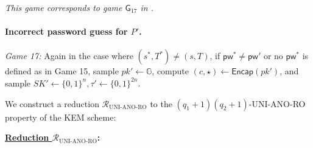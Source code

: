 \documentclass{article}
\theoremstyle{plain}
\theoremstyle{definition}
\theoremstyle{remark}
\newcommand{\group}{\mathbb{G}}
\newcommand{\red}{\mathcal{R}}
\newcommand{\Encap}{\mathsf{Encap}}
\newcommand{\pw}{\mathsf{pw}}
\begin{document}
\emph{{\color{red}This game corresponds to game $\mathsf{G}_{17}$ in \cite{EPRINT:ArrBarJar25}.}}

\paragraph{Incorrect password guess for $P'$.}
\mbox{}

\medskip\noindent\emph{Game 17:} Again in the case where $(s^*,T^*) \neq (s,T)$, if $\pw^* \neq \pw'$ or no $\pw^*$ is defined as in Game 15, sample $pk' \gets \group$, compute $(c,\star) \gets \Encap(pk')$, and sample $SK' \gets \{0,1\}^n, \tau' \gets \{0,1\}^{2n}$.

We construct a reduction $\red_\text{UNI-ANO-RO}$ to the $(q_1+1)(q_2+1)$-UNI-ANO-RO property of the KEM scheme:

\medskip\noindent\textbf{\underline{Reduction $\red_\mathrm{UNI\text{-}ANO\text{-}RO}$}:}
\end{document}
